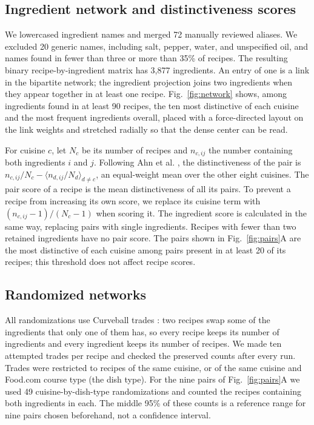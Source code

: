 \subsection*{Ingredient network and distinctiveness scores}
We lowercased ingredient names and merged 72 manually reviewed aliases. We excluded 20 generic names, including salt, pepper, water, and unspecified oil, and names found in fewer than three or more than 35\% of recipes. The resulting binary recipe-by-ingredient matrix has 3,877 ingredients. An entry of one is a link in the bipartite network; the ingredient projection joins two ingredients when they appear together in at least one recipe. Fig.~\ref{fig:network} shows, among ingredients found in at least 90 recipes, the ten most distinctive of each cuisine and the most frequent ingredients overall, placed with a force-directed layout on the link weights and stretched radially so that the dense center can be read.

For cuisine $c$, let $N_c$ be its number of recipes and $n_{c,ij}$ the number containing both ingredients $i$ and $j$. Following Ahn et al. \cite{ahn2011flavor}, the distinctiveness of the pair is $n_{c,ij}/N_c - \langle n_{d,ij}/N_d\rangle_{d\ne c}$, an equal-weight mean over the other eight cuisines. The pair score of a recipe is the mean distinctiveness of all its pairs. To prevent a recipe from increasing its own score, we replace its cuisine term with $(n_{c,ij}-1)/(N_c-1)$ when scoring it. The ingredient score is calculated in the same way, replacing pairs with single ingredients. Recipes with fewer than two retained ingredients have no pair score. The pairs shown in Fig.~\ref{fig:pairs}A are the most distinctive of each cuisine among pairs present in at least 20 of its recipes; this threshold does not affect recipe scores.

\subsection*{Randomized networks}
All randomizations use Curveball trades \cite{strona2014curveball}: two recipes swap some of the ingredients that only one of them has, so every recipe keeps its number of ingredients and every ingredient keeps its number of recipes. We made ten attempted trades per recipe and checked the preserved counts after every run. Trades were restricted to recipes of the same cuisine, or of the same cuisine and Food.com course type (the dish type). For the nine pairs of Fig.~\ref{fig:pairs}A we used 49 cuisine-by-dish-type randomizations and counted the recipes containing both ingredients in each. The middle 95\% of these counts is a reference range for nine pairs chosen beforehand, not a confidence interval.

